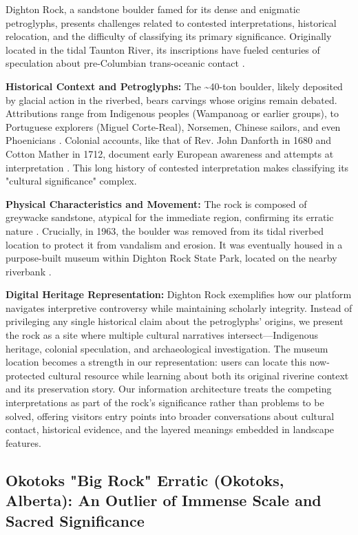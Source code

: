 Dighton Rock, a sandstone boulder famed for its dense and enigmatic petroglyphs, presents challenges related to contested interpretations, historical relocation, and the difficulty of classifying its primary significance. Originally located in the tidal Taunton River, its inscriptions have fueled centuries of speculation about pre-Columbian trans-oceanic contact \cite{Lenik2009, Delabarre1928}.

\textbf{Historical Context and Petroglyphs:} The \textasciitilde40-ton boulder, likely deposited by glacial action in the riverbed, bears carvings whose origins remain debated. Attributions range from Indigenous peoples (Wampanoag or earlier groups), to Portuguese explorers (Miguel Corte-Real), Norsemen, Chinese sailors, and even Phoenicians \cite{Lenik2009, Pohl1950}. Colonial accounts, like that of Rev. John Danforth in 1680 and Cotton Mather in 1712, document early European awareness and attempts at interpretation \cite{Lenik2009, Delabarre1928}. This long history of contested interpretation makes classifying its "cultural significance" complex.

\textbf{Physical Characteristics and Movement:} The rock is composed of greywacke sandstone, atypical for the immediate region, confirming its erratic nature \cite{Delabarre1928}. Crucially, in 1963, the boulder was removed from its tidal riverbed location to protect it from vandalism and erosion. It was eventually housed in a purpose-built museum within Dighton Rock State Park, located on the nearby riverbank \cite{Lenik2009, MassDCRDighton}.

\textbf{Digital Heritage Representation:} Dighton Rock exemplifies how our platform navigates interpretive controversy while maintaining scholarly integrity. Instead of privileging any single historical claim about the petroglyphs' origins, we present the rock as a site where multiple cultural narratives intersect—Indigenous heritage, colonial speculation, and archaeological investigation. The museum location becomes a strength in our representation: users can locate this now-protected cultural resource while learning about both its original riverine context and its preservation story. Our information architecture treats the competing interpretations as part of the rock's significance rather than problems to be solved, offering visitors entry points into broader conversations about cultural contact, historical evidence, and the layered meanings embedded in landscape features.

\subsection{Okotoks "Big Rock" Erratic (Okotoks, Alberta): An Outlier of Immense Scale and Sacred Significance}
\label{subsec:okotoks}

